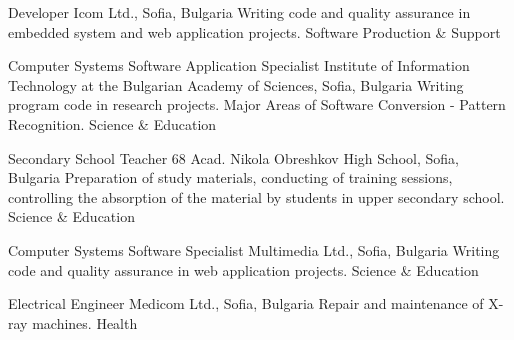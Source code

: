 \documentclass[english,a4paper]{europasscv}
\begin{document}
\begin{europasscv}
   {Developer}
  \ecvitem {} {Icom Ltd., Sofia, Bulgaria}
  \ecvitem {} {Writing code and quality assurance in embedded system and web application projects.}
  \ecvitem {} { \quad Software Production \& Support}

   {Computer Systems Software Application Specialist}
  \ecvitem {} {Institute of Information Technology at the Bulgarian Academy of Sciences, Sofia, Bulgaria}
  \ecvitem {} {Writing program code in research projects. Major Areas of Software Conversion - Pattern Recognition.}
  \ecvitem {} { \quad Science \& Education}
  
   {Secondary School Teacher}
  \ecvitem {} {68 Acad. Nikola Obreshkov High School, Sofia, Bulgaria}
  \ecvitem {} {Preparation of study materials, conducting of training sessions, controlling the absorption of the material by students in upper secondary school.}
  \ecvitem {} { \quad Science \& Education}
  
   {Computer Systems Software Specialist}
  \ecvitem {} {Multimedia Ltd., Sofia, Bulgaria}
  \ecvitem {} {Writing code and quality assurance in web application projects.}
  \ecvitem {} { \quad Science \& Education}
  
   {Electrical Engineer}
  \ecvitem {} {Medicom Ltd., Sofia, Bulgaria}
  \ecvitem {} {Repair and maintenance of X-ray machines.}
  \ecvitem {} { \quad Health}
  
  
  
  
  
  
  

\end{europasscv}
\end{document}
